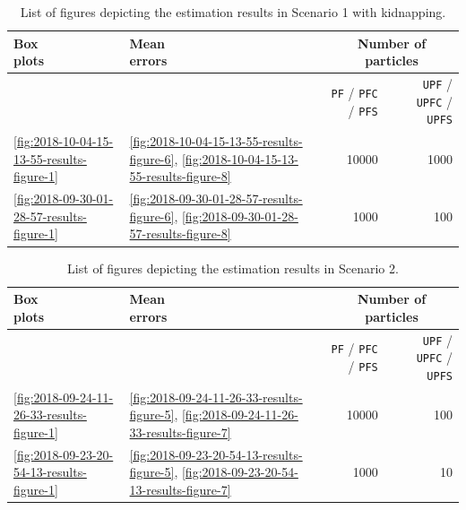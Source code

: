 \begin{table}
\centering
{}\begin{tabular}{@{}llrrrr@{}}
\toprule
\thead{\normalsize Box \\ \normalsize plots} & \thead{\normalsize Mean \\ \normalsize errors} & \phantom{a} & \multicolumn{3}{c}{Number of particles} \\
\midrule
& & & \texttt{PF} / \texttt{PFC} / \texttt{PFS} & \phantom{a} & \texttt{UPF} / \texttt{UPFC} / \texttt{UPFS} \\
\cmidrule{4-4} \cmidrule{6-6}
\ref{fig:2018-10-04-15-13-55-results-figure-1} & \ref{fig:2018-10-04-15-13-55-results-figure-6}, \ref{fig:2018-10-04-15-13-55-results-figure-8} & & 10000 & & 1000 \\ 
\ref{fig:2018-09-30-01-28-57-results-figure-1} & \ref{fig:2018-09-30-01-28-57-results-figure-6}, \ref{fig:2018-09-30-01-28-57-results-figure-8} & & 1000 & & 100 \\ 
\bottomrule
\end{tabular}
\caption{List of figures depicting the estimation results in Scenario 1 with kidnapping.}
\label{tab:results_scenario1_kidnapping}
\end{table}




\begin{table}
\centering
{}\begin{tabular}{@{}llrrrr@{}}
\toprule
\thead{\normalsize Box \\ \normalsize plots} & \thead{\normalsize Mean \\ \normalsize errors} & \phantom{a} & \multicolumn{3}{c}{Number of particles} \\
\midrule
& & & \texttt{PF} / \texttt{PFC} / \texttt{PFS} & \phantom{a} & \texttt{UPF} / \texttt{UPFC} / \texttt{UPFS} \\
\cmidrule{4-4} \cmidrule{6-6}
\ref{fig:2018-09-24-11-26-33-results-figure-1} & \ref{fig:2018-09-24-11-26-33-results-figure-5}, \ref{fig:2018-09-24-11-26-33-results-figure-7} & & 10000 & & 100 \\ 
\ref{fig:2018-09-23-20-54-13-results-figure-1} & \ref{fig:2018-09-23-20-54-13-results-figure-5}, \ref{fig:2018-09-23-20-54-13-results-figure-7} & & 1000 & & 10 \\ 
\bottomrule
\end{tabular}
\caption{List of figures depicting the estimation results in Scenario 2.}
\label{tab:results_scenario2}
\end{table}


